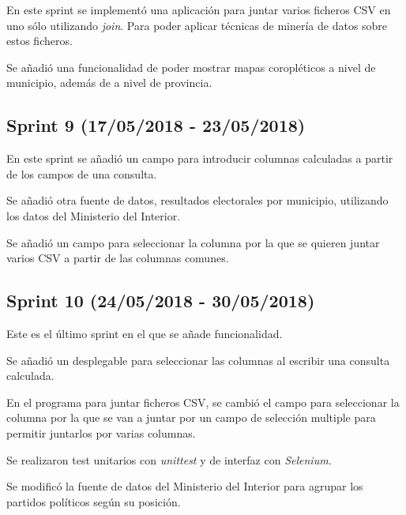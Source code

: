 En este sprint se implementó una aplicación para juntar varios ficheros CSV en uno sólo utilizando \textit{join}. Para poder aplicar técnicas de minería de datos sobre estos ficheros.

Se añadió una funcionalidad de poder mostrar mapas coropléticos a nivel de municipio, además de a nivel de provincia.



\subsection{Sprint 9 (17/05/2018 - 23/05/2018)}

En este sprint se añadió un campo para introducir columnas calculadas a partir de los campos de una consulta. 

Se añadió otra fuente de datos, resultados electorales por municipio, utilizando los datos del Ministerio del Interior.

Se añadió un campo para seleccionar la columna por la que se quieren juntar varios CSV a partir de las columnas comunes.



\subsection{Sprint 10 (24/05/2018 - 30/05/2018)}

Este es el último sprint en el que se añade funcionalidad.

Se añadió un desplegable para seleccionar las columnas al escribir una consulta calculada.

En el programa para juntar ficheros CSV, se cambió el campo para seleccionar la columna por la que se van a juntar por un campo de selección multiple para permitir juntarlos por varias columnas.

Se realizaron test unitarios con \textit{unittest} y de interfaz con \textit{Selenium}.

Se modificó la fuente de datos del Ministerio del Interior para agrupar los partidos políticos según su posición.


